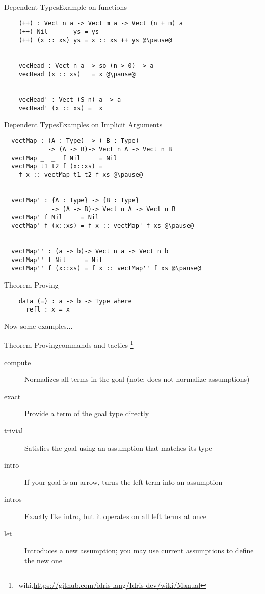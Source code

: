 \documentclass[handout]{beamer}
\begin{document}
\begin{frame}[fragile]{Dependent Types}{Example on functions}
  \begin{lstlisting}
    (++) : Vect n a -> Vect m a -> Vect (n + m) a
    (++) Nil       ys = ys
    (++) (x :: xs) ys = x :: xs ++ ys @\pause@


    vecHead : Vect n a -> so (n > 0) -> a
    vecHead (x :: xs) _ = x @\pause@


    vecHead' : Vect (S n) a -> a
    vecHead' (x :: xs) =  x
  \end{lstlisting}
\end{frame}

\begin{frame}[fragile]{Dependent Types}{Examples on Implicit Arguments}
  \begin{lstlisting}
  vectMap : (A : Type) -> ( B : Type)
            -> (A -> B)-> Vect n A -> Vect n B
  vectMap _  _  f Nil     = Nil
  vectMap t1 t2 f (x::xs) = 
    f x :: vectMap t1 t2 f xs @\pause@


  vectMap' : {A : Type} -> {B : Type}
             -> (A -> B)-> Vect n A -> Vect n B
  vectMap' f Nil     = Nil
  vectMap' f (x::xs) = f x :: vectMap' f xs @\pause@


  vectMap'' : (a -> b)-> Vect n a -> Vect n b
  vectMap'' f Nil     = Nil
  vectMap'' f (x::xs) = f x :: vectMap'' f xs @\pause@
  \end{lstlisting}
\end{frame}

\begin{frame}[fragile]{Theorem Proving}
  \begin{lstlisting}
    data (=) : a -> b -> Type where
      refl : x = x
  \end{lstlisting}
  \pause
  Now some examples...
\end{frame}
\begin{frame}{Theorem Proving}{commands and tactics
    \footnote[frame,1]
    {\idris-wiki,\url{https://github.com/idris-lang/Idris-dev/wiki/Manual}}}
  \begin{description}
  \item[compute] Normalizes all terms in the goal (note: does not
    normalize assumptions)
  \item[exact] Provide a term of the goal type directly
  \item[trivial] Satisfies the goal using an assumption that
    matches its type
  \item[intro] If your goal is an arrow, turns the left term into
    an assumption
  \item[intros] Exactly like intro, but it operates on all left
    terms at once
  \item[let] Introduces a new assumption; you may use current
    assumptions to define the new one
  \end{description}
\end{frame}
\end{document}
